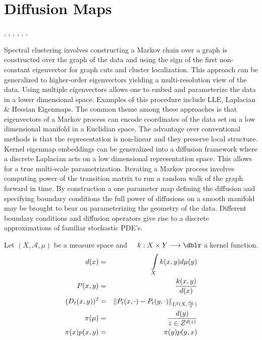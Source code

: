\section{Diffusion Maps}
\cite{DMBremerabstractdiffusion}, \cite{DMCarnegieinformationdiffusion}, \cite{DMCoifmandiffusionmaps},
\cite{DMKubota00reactiondiffusionsystems}, \cite{DMLafferty05diffusionkernels},
\cite{DMNadler06diffusionmaps}.

Spectral clustering involves constructing a Markov chain over a graph is constructed over the graph of the data and using the sign of the first non-constant eigenvector for graph cuts and cluster localization.  This approach can be generalized to higher-order eigenvectors yielding a multi-resolution view of the data. Using multiple eigenvectors allows one to embed and parameterize the data in a lower dimensional space.  Examples of this procedure include LLE, Laplacian \& Hessian Eigenmaps.  The common theme among these approaches is that eigenvectors of a Markov process can encode coordinates of the data set on a low dimensional manifold in a Euclidian space.  The advantage over conventional methods is that the representation is non-linear and they preserve local structure. Kernel eigenmap embeddings can be generalized into a diffusion  framework where a discrete Laplacian acts on a low dimensional representation space.  This allows for a true multi-scale parametrization.  Iterating a Markov process involves computing power of the transition matrix to run a random walk of the graph forward in time.   By construction a one parameter map defining the diffusion and specifying boundary conditions the full power of diffusions on a smooth manifold may be brought to bear on parameterizing the geometry of the data.  Different boundary conditions and diffusion operators give rise to a discrete approximations of familiar stochastic PDE's.

Let $(X,\mathcal{A},\mu)$ be a measure space and $\quad k: X \times Y \longrightarrow \dblr $ a kernel function.
 \begin{eqnarray}
 d(x) &=& \int\limits_{X} k(x,y) d \mu(y)  \\
 P(x,y) &=& \frac{ k(x,y) }{ d(x) }    \\
 (D_t (x,y))^2 &=& \left\Vert P_t(x, \cdot) - P_t(y,\cdot )\right\Vert_{ L^2(X,\frac{d\mu}{\pi}) }  \\
 \pi(\mu) &=&  \frac{d(y)}{z \in Z^{d(z)} } \\
 \pi(x) p(x,y) &=& \pi(y) p(y,x)
 \end{eqnarray}


